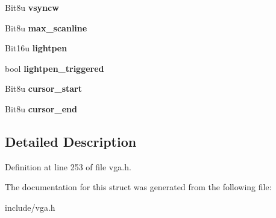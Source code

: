 \begin{DoxyCompactItemize}
\item 
\hypertarget{structVGA__OTHER_a6214860b81fc58e6a2b6712438cfdf87}{Bit8u {\bfseries vsyncw}}\label{structVGA__OTHER_a6214860b81fc58e6a2b6712438cfdf87}

\item 
\hypertarget{structVGA__OTHER_a5cda2fe9d1bbdb240fed75fbd4ebd54c}{Bit8u {\bfseries max\-\_\-scanline}}\label{structVGA__OTHER_a5cda2fe9d1bbdb240fed75fbd4ebd54c}

\item 
\hypertarget{structVGA__OTHER_aad2e4a57fdf43dd565398a1133880fe7}{Bit16u {\bfseries lightpen}}\label{structVGA__OTHER_aad2e4a57fdf43dd565398a1133880fe7}

\item 
\hypertarget{structVGA__OTHER_afdc8e6fe00dceb5d216a683d60e5c60d}{bool {\bfseries lightpen\-\_\-triggered}}\label{structVGA__OTHER_afdc8e6fe00dceb5d216a683d60e5c60d}

\item 
\hypertarget{structVGA__OTHER_ac1e5b1a383040b106970a2e96ffe7ba9}{Bit8u {\bfseries cursor\-\_\-start}}\label{structVGA__OTHER_ac1e5b1a383040b106970a2e96ffe7ba9}

\item 
\hypertarget{structVGA__OTHER_a15dd5380b25f09d7bd0e6eb8b8380cbe}{Bit8u {\bfseries cursor\-\_\-end}}\label{structVGA__OTHER_a15dd5380b25f09d7bd0e6eb8b8380cbe}

\end{DoxyCompactItemize}


\subsection{Detailed Description}


Definition at line 253 of file vga.\-h.



The documentation for this struct was generated from the following file\-:\begin{DoxyCompactItemize}
\item 
include/vga.\-h\end{DoxyCompactItemize}
